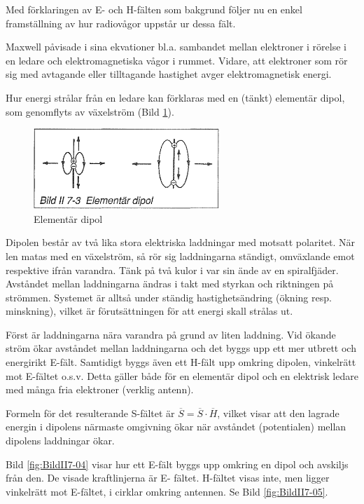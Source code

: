 Med förklaringen av E- och H-fälten som bakgrund följer nu en enkel
framställning av hur radiovågor uppstår ur dessa fält.

Maxwell påvisade i sina ekvationer bl.a.  sambandet mellan elektroner
i rörelse i en ledare och elektromagnetiska vågor i rummet.  Vidare,
att elektroner som rör sig med avtagande eller tilltagande hastighet
avger elektromagnetisk energi.

Hur energi strålar från en ledare kan förklaras med en (tänkt)
elementär dipol, som genomflyts av växelström (Bild \ref{fig:BildII7-03}).

\begin{figure}[h]
\begin{center}
\includegraphics[width=7cm]{images/bild_2_7-03}
\caption{Elementär dipol}
\label{fig:BildII7-03}
\end{center}
\end{figure}

Dipolen består av två lika stora elektriska laddningar med motsatt
polaritet. När len matas med en växelström, så rör sig laddningarna
ständigt, omväxlande emot respektive ifrån varandra. Tänk på två kulor
i var sin ände av en spiralfjäder. Avståndet mellan laddningarna
ändras i takt med styrkan och riktningen på strömmen. Systemet är
alltså under ständig hastighetsändring (ökning resp. minskning),
vilket är förutsättningen för att energi skall strålas ut.

Först är laddningarna nära varandra på grund av liten laddning. Vid
ökande ström ökar avståndet mellan laddningarna och det byggs upp ett
mer utbrett och energirikt E-fält. Samtidigt byggs även ett H-fält upp
omkring dipolen, vinkelrätt mot E-fältet o.s.v.  Detta gäller både för
en elementär dipol och en elektrisk ledare med många fria elektroner
(verklig antenn).

Formeln för det resulterande S-fältet är \(\overline{S} =
\overline{S}\cdot\overline{H}\), vilket visar att den lagrade energin
i dipolens närmaste omgivning ökar när avståndet (potentialen) mellan
dipolens laddningar ökar.

Bild \ref{fig:BildII7-04} visar hur ett E-fält byggs upp omkring en dipol och
avskiljs från den. De visade kraftlinjerna är E- fältet. H-fältet
visas inte, men ligger vinkelrätt mot E-fältet, i cirklar omkring
antennen. Se Bild \ref{fig:BildII7-05}.

